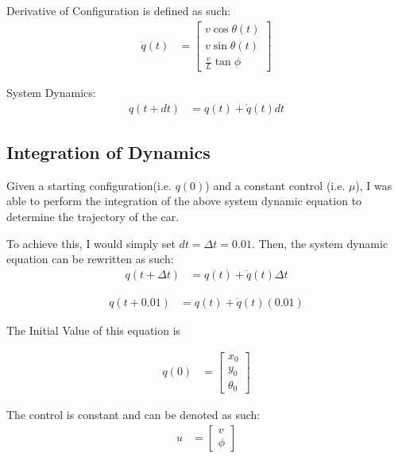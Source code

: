 \documentclass{article}
\begin{document}
Derivative of Configuration is defined as such: \newline 
\begin{align}
    \dot{q}(t) &= \begin{bmatrix}
           v\cos{\theta(t)} \\
           v\sin{\theta(t)} \\
           \frac{v}{L} \tan{\phi}
         \end{bmatrix}
\end{align}

System Dynamics: \newline 
\begin{align}
    q(t + dt) &= q(t) + \dot{q}(t) dt
\end{align}

\subsection{Integration of Dynamics}
Given a starting configuration(i.e. $q(0)$) and a constant control (i.e. $\mu$), I was able to perform the integration of the above system dynamic equation to determine the trajectory of the car. 

To achieve this, I would simply set $dt = \Delta t = 0.01$. Then, the system dynamic equation can be rewritten as such: \newline 
\begin{align}
    q(t + \Delta t) &= q(t) + \dot{q}(t) \Delta t
\end{align}

\begin{align}
    q(t + 0.01) &= q(t) + \dot{q}(t) (0.01)
\end{align}

The Initial Value of this equation is 

\begin{align}
    q(0) &= \begin{bmatrix}
           x_0 \\
           y_0 \\
           \theta_0
         \end{bmatrix}
\end{align}

The control is constant and can be denoted as such: 
\begin{align}
    u &= \begin{bmatrix}
           v \\
           \phi
         \end{bmatrix}
\end{align}
\end{document}
